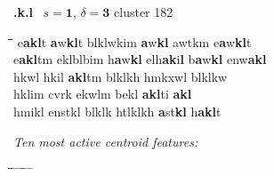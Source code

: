\begin{figure}[!t]
\begin{mdframed}
\vspace{2pt}
{\LARGE \textbf{.k.l}} \,\Large{} \hfill \large{$s = \mathbf{1}$, $\delta = \mathbf{3}$} \hfill {\normalsize cluster 182}%
\vspace{3pt}
\begin{normalsize}
\begin{tabbing}
\hspace*{13ex}\= \hspace*{13ex}\=\hspace*{13ex}\=\hspace*{13ex}\=\hspace*{13ex}\=\hspace*{11ex} \kill
e\textbf{a}\textbf{k}\textbf{l}t \> \textbf{a}w\textbf{k}\textbf{l}t \> blklwkim \> \textbf{a}w\textbf{k}\textbf{l} \> awtkm \> e\textbf{a}w\textbf{k}\textbf{l}t \\
e\textbf{a}\textbf{k}\textbf{l}tm \> eklblbim \> h\textbf{a}w\textbf{k}\textbf{l} \> elh\textbf{a}\textbf{k}i\textbf{l} \> b\textbf{a}w\textbf{k}\textbf{l} \> enw\textbf{a}\textbf{k}\textbf{l} \\
hkwl \> hkil \> \textbf{a}\textbf{k}\textbf{l}tm \> blklkh \> hmkxwl \> blklkw \\
hklim \> cvrk \> ekwlm \> bekl \> \textbf{a}\textbf{k}\textbf{l}ti \> \textbf{a}\textbf{k}\textbf{l} \\
hmikl \> enstkl \> blklk \> htlklkh \> \textbf{a}st\textbf{k}\textbf{l} \> h\textbf{a}\textbf{k}\textbf{l}t 
\end{tabbing}
\end{normalsize}
\vspace{3pt}
\begin{mdframed}
\begin{small}
\textit{Ten most active centroid features:}
\vspace{-5pt}
\begin{tabbing}
\hspace*{6ex}\= \hspace*{10ex}\= \hspace*{6ex}\= \hspace*{10ex} \= \hspace*{5ex} \= \hspace*{9ex} \= \hspace*{5ex}\= \hspace*{9ex} \= \hspace*{6ex} \= \hspace*{10ex}\kill

\end{tabbing}
\end{small}
\end{mdframed}
\end{mdframed}
\end{figure}
